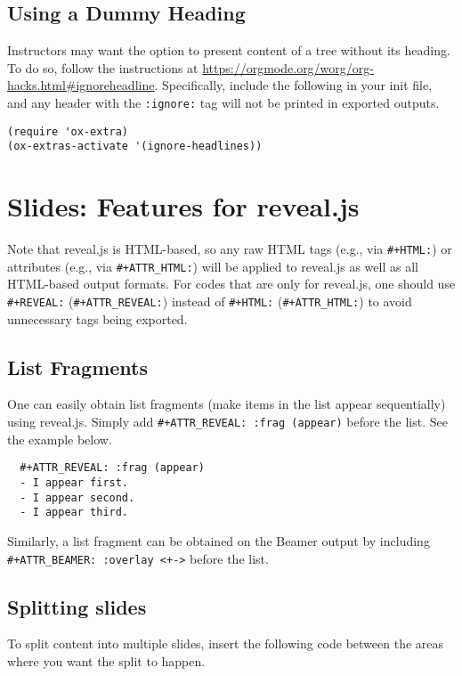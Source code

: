 \documentclass[10pt,article]{article}
\begin{document}
\subsection{Using a Dummy Heading}
\label{sec:org4f171d5}
Instructors may want the option to present content of a tree without its heading. To do so, follow the instructions at
\url{https://orgmode.org/worg/org-hacks.html\#ignoreheadline}. Specifically, include the
following in your init file, and any header with the \texttt{:ignore:} tag will not be printed in exported outputs.

\begin{verbatim}
(require 'ox-extra)
(ox-extras-activate '(ignore-headlines))
\end{verbatim}
\section{Slides: Features for reveal.js}
\label{sec:org88aafb2}
\begin{mdframed}
Note that reveal.js is HTML-based, so any raw HTML tags (e.g., via \texttt{\#+HTML:})
or attributes (e.g., via \texttt{\#+ATTR\_HTML:}) will be applied to reveal.js as well
as all HTML-based output formats.  For codes that are only for reveal.js, one
should use \texttt{\#+REVEAL:} (\texttt{\#+ATTR\_REVEAL:}) instead of \texttt{\#+HTML:}
(\texttt{\#+ATTR\_HTML:}) to avoid unnecessary tags being exported.
\end{mdframed}

\subsection{List Fragments}
\label{sec:org3b19df4}
One can easily obtain list fragments (make items in the list appear
sequentially) using reveal.js. Simply add \texttt{\#+ATTR\_REVEAL: :frag
(appear)} before the list. See the example below.

\begin{verbatim}
  #+ATTR_REVEAL: :frag (appear)
  - I appear first.
  - I appear second.
  - I appear third.
\end{verbatim}

\begin{mdframed}
Similarly, a list fragment can be obtained on the Beamer output by including
\texttt{\#+ATTR\_BEAMER: :overlay <+->} before the list.
\end{mdframed}

\subsection{Splitting slides}
\label{sec:org157bd67}
To split content into multiple slides, insert the following code between the areas where you want the split to happen.
\end{document}
